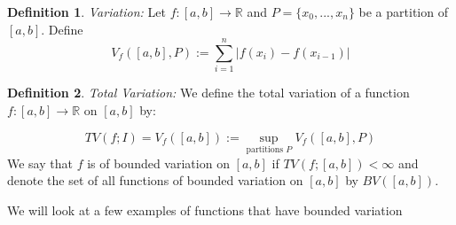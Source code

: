 \documentclass[11pt,a4paper]{article}
\theoremstyle{definition}
\newtheorem{definition}{Definition}[section]
\begin{document}
\begin{definition}
\textit{Variation:} Let $f: [a,b] \to \mathbb{R}$ and $P = \{x_0, ..., x_n\}$ be a partition of $[a,b]$. Define \[
V_f ([a,b], P)  := \sum \limits _{i=1}^n |f(x_i) - f(x_{i-1})|
\]
\end{definition}

\begin{definition}
    \textit{Total Variation:} We define the total variation of a function $f: [a,b] \to \mathbb{R}$ on $[a,b]$ by:
    
    \[
    TV(f;I) = V_f ([a,b]) := \sup \limits _{\text{partitions } P} V_f ([a,b], P)
    \]
    We say that $f$ is of bounded variation on $[a,b]$ if $TV(f;[a,b]) < \infty$ and denote the set of all functions of bounded variation on $[a,b]$ by $BV([a,b])$.
\end{definition}
\noindent
We will look at a few examples of functions that have bounded variation
\end{document}
